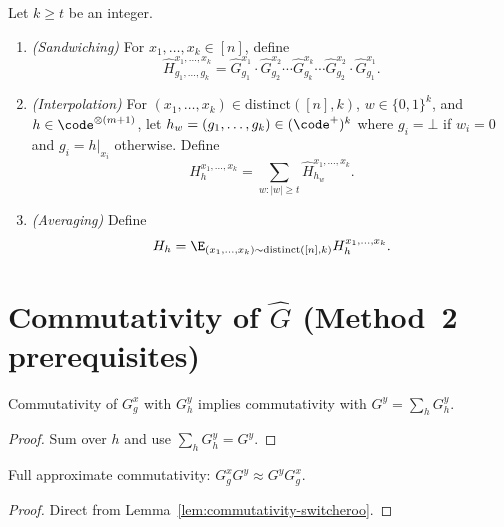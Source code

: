 \begin{definition}\label{def:pasted-meas}
  Let $k\ge t$ be an integer.
  \begin{enumerate}
    \item \emph{(Sandwiching)} For $x_1,\dots,x_k\in[n]$, define
      \[
        \widehat{H}^{x_1,\dots,x_k}_{g_1,\dots,g_k}
        =\widehat{G}^{x_1}_{g_1}\cdot\widehat{G}^{x_2}_{g_2}
         \cdots\widehat{G}^{x_k}_{g_k}\cdots
         \widehat{G}^{x_2}_{g_2}\cdot\widehat{G}^{x_1}_{g_1}.
      \]
    \item \emph{(Interpolation)} For $(x_1,\dots,x_k)\in\mathrm{distinct}([n],k)$,
      $w\in\{0,1\}^k$, and $h\in\code^{\otimes(m+1)}$, let
      $h_w=(g_1,\dots,g_k)\in(\code^+)^k$ where
      $g_i=\bot$ if $w_i=0$ and $g_i=h|_{x_i}$ otherwise. Define
      \[
        H^{x_1,\dots,x_k}_h
        =\sum_{w:|w|\ge t}\widehat{H}^{x_1,\dots,x_k}_{h_w}.
      \]
    \item \emph{(Averaging)} Define
      \[
        H_h=\E_{(x_1,\dots,x_k)\sim\mathrm{distinct}([n],k)}
          H^{x_1,\dots,x_k}_h.
      \]
  \end{enumerate}
\end{definition}

\section{Commutativity of $\widehat{G}$ (Method~2 prerequisites)}

\begin{lemma}
  \label{lem:commutativity-switcheroo}
  Commutativity of $G^x_g$ with $G^y_h$ implies commutativity with
  $G^y=\sum_h G^y_h$.
\end{lemma}
\begin{proof}
  Sum over $h$ and use $\sum_h G^y_h = G^y$.
\end{proof}

\begin{corollary}[Commutativity of $G$'s]\label{cor:g-comm}
  Full approximate commutativity: $G^x_g G^y\approx G^y G^x_g$.
\end{corollary}
\begin{proof}
  Direct from Lemma~\ref{lem:commutativity-switcheroo}.
\end{proof}


